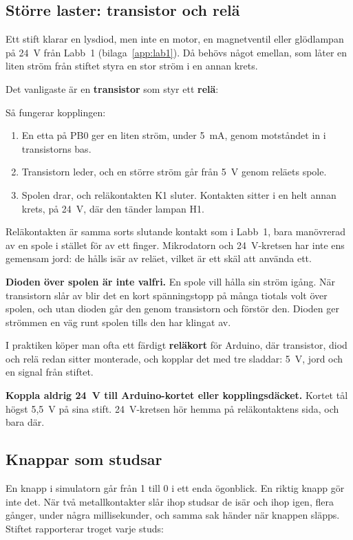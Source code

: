 \subsection{Större laster: transistor och relä}
\label{c11:a3}
Ett stift klarar en lysdiod, men inte en motor, en magnetventil eller glödlampan på 24~V från Labb~1
(bilaga~\ref{app:lab1}). Då behövs något emellan, som låter en liten ström från stiftet styra en
stor ström i en annan krets.

Det vanligaste är en \textbf{transistor} som styr ett \textbf{relä}:


\noindent Så fungerar kopplingen:
\begin{enumerate}
  \item En etta på PB0 ger en liten ström, under 5~mA, genom motståndet in i transistorns bas.
  \item Transistorn leder, och en större ström går från 5~V genom reläets spole.
  \item Spolen drar, och reläkontakten K1 sluter. Kontakten sitter i en helt annan krets, på 24~V,
    där den tänder lampan H1.
\end{enumerate}

Reläkontakten är samma sorts slutande kontakt som i Labb~1, bara manövrerad av en spole i stället
för av ett finger. Mikrodatorn och 24~V-kretsen har inte ens gemensam jord: de hålls isär av reläet,
vilket är ett skäl att använda ett.

\textbf{Dioden över spolen är inte valfri.} En spole vill hålla sin ström igång. När transistorn
slår av blir det en kort spänningstopp på många tiotals volt över spolen, och utan dioden går den
genom transistorn och förstör den. Dioden ger strömmen en väg runt spolen tills den har klingat av.

I praktiken köper man ofta ett färdigt \textbf{reläkort} för Arduino, där transistor, diod och relä
redan sitter monterade, och kopplar det med tre sladdar: 5~V, jord och en signal från stiftet.

\begin{warning}
\textbf{Koppla aldrig 24~V till Arduino-kortet eller kopplingsdäcket.} Kortet tål högst 5,5~V på
sina stift. 24~V-kretsen hör hemma på reläkontaktens sida, och bara där.
\end{warning}

\subsection{Knappar som studsar}
\label{c11:a4}
En knapp i simulatorn går från 1 till 0 i ett enda ögonblick. En riktig knapp gör inte det. När två
metallkontakter slår ihop studsar de isär och ihop igen, flera gånger, under några millisekunder,
och samma sak händer när knappen släpps. Stiftet rapporterar troget varje studs:

